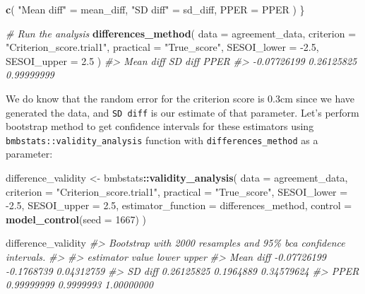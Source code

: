 \documentclass[
]{book}
\newenvironment{Shaded}{\begin{snugshade}}{\end{snugshade}}
\newcommand{\CommentTok}[1]{\textcolor[rgb]{0.56,0.35,0.01}{\textit{#1}}}
\newcommand{\DataTypeTok}[1]{\textcolor[rgb]{0.13,0.29,0.53}{#1}}
\newcommand{\DecValTok}[1]{\textcolor[rgb]{0.00,0.00,0.81}{#1}}
\newcommand{\FloatTok}[1]{\textcolor[rgb]{0.00,0.00,0.81}{#1}}
\newcommand{\KeywordTok}[1]{\textcolor[rgb]{0.13,0.29,0.53}{\textbf{#1}}}
\newcommand{\NormalTok}[1]{#1}
\newcommand{\OperatorTok}[1]{\textcolor[rgb]{0.81,0.36,0.00}{\textbf{#1}}}
\newcommand{\StringTok}[1]{\textcolor[rgb]{0.31,0.60,0.02}{#1}}
\begin{document}
\begin{Shaded}
\begin{Highlighting}[]
  \KeywordTok{c}\NormalTok{(}
    \StringTok{"Mean diff"}\NormalTok{ =}\StringTok{ }\NormalTok{mean\_diff,}
    \StringTok{"SD diff"}\NormalTok{ =}\StringTok{ }\NormalTok{sd\_diff,}
    \DataTypeTok{PPER =}\NormalTok{ PPER}
\NormalTok{  )}
\NormalTok{\}}

\CommentTok{\# Run the analysis}
\KeywordTok{differences\_method}\NormalTok{(}
  \DataTypeTok{data =}\NormalTok{ agreement\_data,}
  \DataTypeTok{criterion =} \StringTok{"Criterion\_score.trial1"}\NormalTok{,}
  \DataTypeTok{practical =} \StringTok{"True\_score"}\NormalTok{,}
  \DataTypeTok{SESOI\_lower =} \FloatTok{{-}2.5}\NormalTok{,}
  \DataTypeTok{SESOI\_upper =} \FloatTok{2.5}
\NormalTok{)}
\CommentTok{\#>   Mean diff     SD diff        PPER }
\CommentTok{\#> {-}0.07726199  0.26125825  0.99999999}
\end{Highlighting}
\end{Shaded}

We do know that the random error for the criterion score is 0.3cm since we have generated the data, and \texttt{SD\ diff} is our estimate of that parameter. Let's perform bootstrap method to get confidence intervals for these estimators using \texttt{bmbstats::validity\_analysis} function with \texttt{differences\_method} as a parameter:

\begin{Shaded}
\begin{Highlighting}[]
\NormalTok{difference\_validity <{-}}\StringTok{ }\NormalTok{bmbstats}\OperatorTok{::}\KeywordTok{validity\_analysis}\NormalTok{(}
  \DataTypeTok{data =}\NormalTok{ agreement\_data,}
  \DataTypeTok{criterion =} \StringTok{"Criterion\_score.trial1"}\NormalTok{,}
  \DataTypeTok{practical =} \StringTok{"True\_score"}\NormalTok{,}
  \DataTypeTok{SESOI\_lower =} \FloatTok{{-}2.5}\NormalTok{,}
  \DataTypeTok{SESOI\_upper =} \FloatTok{2.5}\NormalTok{,}
  \DataTypeTok{estimator\_function =}\NormalTok{ differences\_method,}
  \DataTypeTok{control =} \KeywordTok{model\_control}\NormalTok{(}\DataTypeTok{seed =} \DecValTok{1667}\NormalTok{)}
\NormalTok{)}

\NormalTok{difference\_validity}
\CommentTok{\#> Bootstrap with 2000 resamples and 95\% bca confidence intervals.}
\CommentTok{\#> }
\CommentTok{\#>  estimator       value      lower      upper}
\CommentTok{\#>  Mean diff {-}0.07726199 {-}0.1768739 0.04312759}
\CommentTok{\#>    SD diff  0.26125825  0.1964889 0.34579624}
\CommentTok{\#>       PPER  0.99999999  0.9999993 1.00000000}
\end{Highlighting}
\end{Shaded}
\end{document}

